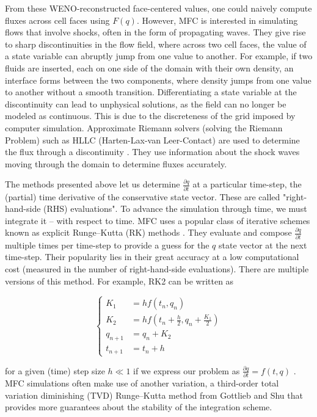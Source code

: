 From these WENO-reconstructed face-centered values, one could naively compute
fluxes across cell faces using $F(q)$. However, MFC is interested in simulating
flows that involve shocks, often in the form of propagating waves. They give rise
to sharp discontinuities in the flow field, where across two cell faces, the
value of a state variable can abruptly jump from one value to another. For example,
if two fluids are inserted, each on one side of the domain with their own density,
an interface forms between the two components, where density jumps from one value
to another without a smooth transition. Differentiating a state variable at the
discontinuity can lead to unphysical solutions, as the field can no longer be
modeled as continuous. This is due to the discreteness of the grid imposed by
computer simulation. Approximate Riemann solvers (solving the Riemann Problem)
such as HLLC (Harten-Lax-van Leer-Contact) are used to determine the flux through
a discontinuity \cite{toro2009riemann}. They use information about the shock waves
moving through the domain to determine fluxes accurately.

The methods presented above let us determine $\frac{\partial q}{\partial t}$ at
a particular time-step, the (partial) time derivative of the conservative state
vector. These are called "right-hand-side (RHS) evaluations". To advance the
simulation through time, we must integrate it -- with respect to time. MFC uses a popular class of
iterative schemes known as explicit Runge--Kutta (RK) methods \cite{BUTCHER1996247}.
They evaluate and compose $\frac{\partial q}{\partial t}$ multiple times per
time-step to provide a guess for the $q$ state vector at the next time-step.
Their popularity lies in their great accuracy at a low computational cost
(measured in the number of right-hand-side evaluations). There are multiple versions
of this method. For example, RK2 can be written as

$$
\begin{cases}
    K_1 &= h f\left(t_n, q_n\right) \\
    K_2 &= h f\left(t_n + \frac{h}{2}, q_n + \frac{K_1}{2}\right) \\
    q_{n+1} &= q_n + K_2 \\
    t_{n+1} &= t_n + h
\end{cases}
$$

\noindent for a given (time) step size $h \ll 1$ if we express our problem as
$\frac{\partial q}{\partial t}=f(t,q)$ \cite{BUTCHER1996247}. MFC simulations
often make use of another variation, a third-order total variation diminishing (TVD)
Runge--Kutta method from Gottlieb and Shu \cite{70473541-9e24-3684-8ded-69b842aad3b3}
that provides more guarantees about the stability of the integration scheme.

